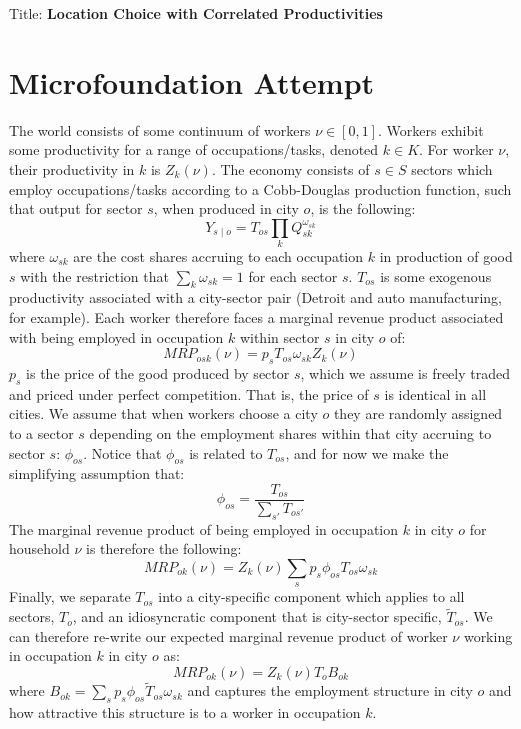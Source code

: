 \documentclass[11pt]{amsart}
\author{}
\begin{document}
Title: \textbf{Location Choice with Correlated Productivities} \\
\section{Microfoundation Attempt}
The world consists of some continuum of workers $\nu\in[0,1]$. Workers exhibit some productivity for a range of occupations/tasks, denoted $k\in{K}$. For worker $\nu$, their productivity in $k$ is $Z_{k}(\nu)$. The economy consists of $s\in{S}$ sectors which employ occupations/tasks according to a Cobb-Douglas production function, such that output for sector $s$, when produced in city $o$, is the following:
\begin{equation}
    Y_{s\mid{o}}={T_{os}}\prod\limits_{k}{Q^{\omega_{sk}}_{sk}}
\end{equation}
where $\omega_{sk}$ are the cost shares accruing to each occupation $k$ in production of good $s$ with the restriction that $\sum\limits_{k}{\omega_{sk}}=1$ for each sector $s$. $T_{os}$ is some exogenous productivity associated with a city-sector pair (Detroit and auto manufacturing, for example). Each worker therefore faces a marginal revenue product associated with being employed in occupation $k$ within sector $s$ in city $o$ of:
\begin{equation}
    {MRP}_{osk}(\nu) = {p_{s}}{T_{os}}{\omega_{sk}}{Z_{k}(\nu)}
\end{equation}
$p_{s}$ is the price of the good produced by sector $s$, which we assume is freely traded and priced under perfect competition. That is, the price of $s$ is identical in all cities. We assume that when workers choose a city $o$ they are randomly assigned to a sector $s$ depending on the employment shares within that city accruing to sector $s$: $\phi_{os}$. Notice that $\phi_{os}$ is related to $T_{os}$, and for now we make the simplifying assumption that:
\begin{equation}
    \phi_{os}=\frac{T_{os}}{\sum\limits_{s'}{T_{os'}}}
\end{equation}
The marginal revenue product of being employed in occupation $k$ in city $o$ for household $\nu$ is therefore the following:
\begin{equation}
    {MRP}_{ok}(\nu) = {Z_{k}(\nu)}\sum\limits_{s}{p_{s}}{\phi_{os}}{T_{os}}{\omega_{sk}}
\end{equation}
Finally, we separate $T_{os}$ into a city-specific component which applies to all sectors, $T_{o}$, and an idiosyncratic component that is city-sector specific, $\tilde{T}_{os}$. We can therefore re-write our expected marginal revenue product of worker $\nu$ working in occupation $k$ in city $o$ as:
\begin{equation}
    {MRP}_{ok}(\nu) = {Z_{k}(\nu)}{T_{o}}{B_{ok}}
\end{equation}
where $B_{ok}=\sum\limits_{s}{p_{s}}{\phi_{os}}{\tilde{T}_{os}}{\omega_{sk}}$ and captures the employment structure in city $o$ and how attractive this structure is to a worker in occupation $k$.
\end{document}
